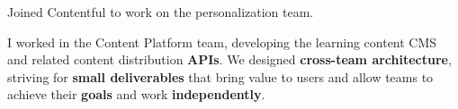 \documentclass[10pt,a4paper,ragged2e,withhyper]{altacv}
\newcommand{\accentbold}[1]{\textbf{\textcolor{accent}{#1}}}
\begin{document}
\begin{paracol}{2}



{\RaggedRight
Joined Contentful to work on the personalization team.
}

\divider


{\RaggedRight
I worked in the Content Platform team, developing the learning content CMS and related content distribution \accentbold{APIs}. We designed \accentbold{cross-team architecture}, striving for \accentbold{small deliverables} that bring value to users and allow teams to achieve their \accentbold{goals} and work \accentbold{independently}.

\medskip

}
\end{paracol}
\end{document}
